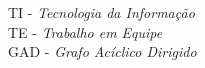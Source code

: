 TI      - \textit{Tecnologia da Informação}\\
TE      - \textit{Trabalho em Equipe}\\
GAD     - \textit{Grafo Acíclico Dirigido}
